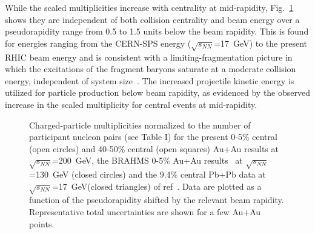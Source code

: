 \documentclass[preprint,showpacs,preprintnumbers,amsmath,amssymb]{revtex4}
\begin{document}
While the scaled multiplicities increase with centrality at
mid-rapidity, Fig.~\ref{dndeta_fragment} shows 
they are independent of both collision centrality and
beam energy over a pseudorapidity range from  0.5 to 1.5 units
below the beam rapidity. This is found for energies
ranging from the CERN-SPS energy 
($\sqrt{s_{NN}}$=17~GeV)
\cite{deines00} to the present RHIC beam energy and is consistent with a
limiting-fragmentation picture in which the excitations of the
fragment baryons saturate at a moderate collision energy,
independent of system size~\cite{bearden01a}. The
increased projectile kinetic energy is utilized for particle
production below beam rapidity, as evidenced by the
observed increase in the scaled multiplicity for central events
at mid-rapidity.  
\begin{figure}
  \caption{
    Charged-particle multiplicities normalized to the number of participant
    nucleon pairs (see Table I) 
    for the present 0-5\% central (open circles) and
    40-50\% central (open squares) Au+Au results at 
    $\sqrt{s_{NN}}$=200~GeV, the BRAHMS 0-5\% Au+Au
    results~\cite{bearden01a} at $\sqrt{s_{NN}}$=130~GeV (closed
    circles) and the 9.4\% central Pb+Pb data at
    $\sqrt{s_{NN}}$=17~GeV(closed triangles) of ref~\cite{deines00}.
    Data are plotted as a function of the
    pseudorapidity shifted by the relevant beam rapidity. Representative total
    uncertainties are shown for a few Au+Au points. }
  \label{dndeta_fragment}
\end{figure}
\end{document}
